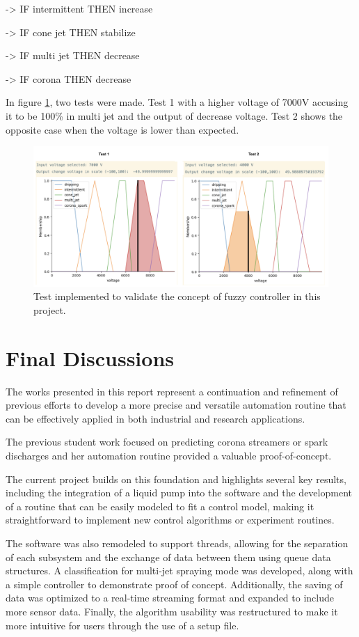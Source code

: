         -> IF intermittent THEN increase

        -> IF cone jet THEN stabilize

        -> IF multi jet THEN decrease

        -> IF corona THEN decrease


        In figure \ref{fig:fuzzyy1}, two tests were made. Test 1 with a higher voltage of 7000V accusing it to be 100\% in multi jet and the output of decrease voltage. Test 2 shows the opposite case when the voltage is lower than expected.

    \begin{figure}[H]
        \centering
        \includegraphics[width=17cm]{Figuras/fuzzy/test3.png}
        \caption{Test implemented to validate the concept of fuzzy controller in this project.}
        \label{fig:fuzzyy1}
    \end{figure}
        

    \section{Final Discussions}

        The works presented in this report represent a continuation and refinement of previous efforts to develop a more precise and versatile automation routine that can be effectively applied in both industrial and research applications. 
        
        The previous student work focused on predicting corona streamers or spark discharges\cite{Monica} and her automation routine provided a valuable proof-of-concept. 
        
        The current project builds on this foundation and highlights several key results, including the integration of a liquid pump into the software and the development of a routine that can be easily modeled to fit a control model, making it straightforward to implement new control algorithms or experiment routines. 
        
        The software was also remodeled to support threads, allowing for the separation of each subsystem and the exchange of data between them using queue data structures. A classification for multi-jet spraying mode was developed, along with a simple controller to demonstrate proof of concept. 
        Additionally, the saving of data was optimized to a real-time streaming format and expanded to include more sensor data. Finally, the algorithm usability was restructured to make it more intuitive for users through the use of a setup file.

        
\clearpage
